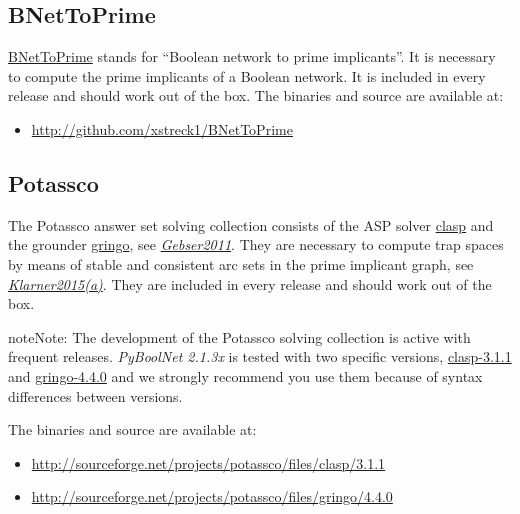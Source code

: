 \documentclass[letterpaper,10pt,english]{sphinxmanual}
\begin{document}
\subsection{BNetToPrime}
\label{Installation:bnettoprime}\label{Installation:installation-bnettoprime}
\href{https://github.com/xstreck1/BNetToPrime}{BNetToPrime} stands for ``Boolean network to prime implicants''. It is necessary to compute the prime implicants of a Boolean network. It is included in every release and should work out of the box. The binaries and source are available at:
\begin{itemize}
\item {} 
\href{http://github.com/xstreck1/BNetToPrime}{http://github.com/xstreck1/BNetToPrime}

\end{itemize}


\subsection{Potassco}
\label{Installation:installation-potassco}\label{Installation:potassco}
The Potassco answer set solving collection consists of the ASP solver \href{http://potassco.sourceforge.net/\#clasp}{clasp} and the grounder \href{http://potassco.sourceforge.net/\#gringo}{gringo}, see {\hyperref[Bibliography:gebser2011]{\emph{Gebser2011}}}.
They are necessary to compute trap spaces by means of stable and consistent arc sets in the prime implicant graph, see {\hyperref[Bibliography:klarner2015trap]{\emph{Klarner2015(a)}}}. They are included in every release and should work out of the box.

\begin{notice}{note}{Note:}
The development of the Potassco solving collection is active with frequent releases.
\emph{PyBoolNet 2.1.3x} is tested with two specific versions, \href{https://sourceforge.net/projects/potassco/files/clasp/3.1.1}{clasp-3.1.1} and \href{https://sourceforge.net/projects/potassco/files/gringo/4.4.0}{gringo-4.4.0} and we strongly recommend you use them because of syntax differences between versions.
\end{notice}

The binaries and source are available at:
\begin{itemize}
\item {} 
\href{http://sourceforge.net/projects/potassco/files/clasp/3.1.1}{http://sourceforge.net/projects/potassco/files/clasp/3.1.1}

\item {} 
\href{http://sourceforge.net/projects/potassco/files/gringo/4.4.0}{http://sourceforge.net/projects/potassco/files/gringo/4.4.0}

\end{itemize}
\end{document}
